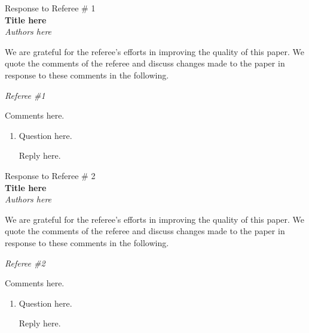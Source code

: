 \documentclass[11pt]{article}
\newcommand{\reply}[1]{\vspace{-0.35cm}\begin{center}\begin{minipage}{0.9\textwidth}\sf\color{Brown}
#1\end{minipage}\end{center}}
\renewcommand{\title}{Title here}
\newcommand{\authors}{Authors here}
\begin{document}
\begin{center}
{\sc Response to Referee \# 1}\\
{\bf \title}\\
{\em \authors}
\end{center}

\noindent
\textsf{\color{Brown}
    We are grateful for the referee's efforts in improving the quality of this paper.  
    We quote the comments of the referee and discuss changes made to the paper in response to these comments in the following.
}
\medskip


\noindent
\textit{Referee \#1} 

Comments here.

\begin{enumerate}
    \item Question here.

        \reply{
            Reply here.
        }

\end{enumerate}

\newpage
\begin{center}
{\sc Response to Referee \# 2}\\
{\bf \title}\\
{\em \authors}
\end{center}

\noindent
\textsf{\color{Brown}
    We are grateful for the referee's efforts in improving the quality of this paper.
    We quote the comments of the referee and discuss changes made to the paper in response to these comments in the following.
}
\medskip


\noindent
\textit{Referee \#2} 

Comments here.

\begin{enumerate}
    \item Question here.

        \reply{
            Reply here.
        }

\end{enumerate}
\end{document}
